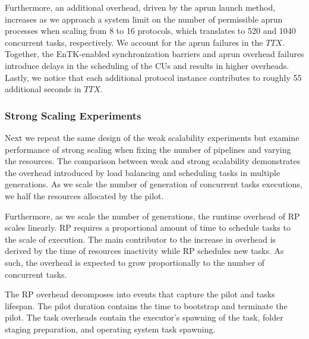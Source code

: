 
Furthermore, an additional overhead, driven by the aprun launch method,
increases as we approach a system limit on the number of permissible aprun
processes when scaling from 8 to 16 protocols, which translates to 520 and
1040 concurrent tasks, respectively. We account for the aprun failures in the
\(TTX\). Together, the EnTK-enabled synchronization barriers and aprun
overhead failures introduce delays in the scheduling of the CUs and results
in higher overheads. Lastly, we notice that each additional protocol instance
contributes to roughly 55 additional seconds in \(TTX\).

\subsubsection{Strong Scaling Experiments}


Next we repeat the same design of the weak scalability experiments but
examine performance of strong scaling when fixing the number of pipelines and
varying the resources. The comparison between weak and strong scalability
demonstrates the overhead introduced by load balancing and scheduling tasks
in multiple generations. As we scale the number of generation of concurrent
tasks executions, we half the resources allocated by the pilot.

Furthermore, as we scale the number of generations, the runtime overhead of
RP scales linearly. RP requires a proportional amount of time to schedule
tasks to the scale of execution. The main contributor to the increase in
overhead is derived by the time of resources inactivity while RP schedules
new tasks. As such, the overhead is expected to grow proportionally to the
number of concurrent tasks.

The RP overhead decomposes into events that capture the pilot and tasks
lifespan. The pilot duration contains the time to bootstrap and terminate the
pilot. The task overheads contain the executor's spawning of the task, folder
staging preparation, and operating system task spawning.

